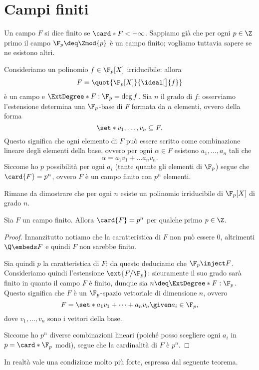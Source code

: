 \section{Campi finiti}

Un campo $F$ si dice finito se $\card*{F} < +\infty$. Sappiamo già che per ogni $p \in \Z$ primo il campo $\F_p \deq \Zmod{p}$ è un campo finito; vogliamo tuttavia sapere se ne esistono altri.

Consideriamo un polinomio $f \in \F_p[X]$ irriducibile: allora \[
    F = \quot{\F_p[X]}{\ideal[\big]{f}}    
\] è un campo e $\ExtDegree*{F : \F_p} = \deg f$. Sia $n$ il grado di $f$: osserviamo l'estensione determina una $\F_p$-base di $F$ formata da $n$ elementi, ovvero della forma \[
    \set*{v_1, \dots, v_n} \subseteq F.    
\] Questo significa che ogni elemento di $F$ può essere scritto come combinazione lineare degli elementi della base, ovvero per ogni $\alpha \in F$ esistono $a_1, \dots, a_n$ tali che \[
    \alpha = a_1v_1 + \dots a_nv_n.    
\] Siccome ho $p$ possibilità per ogni $a_i$ (tante quante gli elementi di $\F_p$) segue che $\card{F} = p^n$, ovvero $F$ è un campo finito con $p^n$ elementi.

Rimane da dimostrare che per ogni $n$ esiste un polinomio irriducibile di $\F_p[X]$ di grado $n$.

\begin{proposition}
    Sia $F$ un campo finito. Allora $\card{F} = p^n$ per qualche primo $p \in \Z$.
\end{proposition}
\begin{proof}
    Innanzitutto notiamo che la caratteristica di $F$ non può essere $0$, altrimenti $\Q \embeds F$ e quindi $F$ non sarebbe finito.

    Sia quindi $p$ la caratteristica di $F$: da questo deduciamo che $\F_p \inject F$. Consideriamo quindi l'estensione $\ext{F / \F_p}$: sicuramente il suo grado sarà finito in quanto il campo $F$ è finito, dunque sia $n \deq \ExtDegree*{F : \F_p}$. Questo significa che $F$ è un $\F_p$-spazio vettoriale di dimensione $n$, ovvero \[
        F = \set*{a_1v_1 + \dots + a_nv_n \given a_i \in \F_p},    
    \] dove $v_1, \dots, v_n$ sono i vettori della base. 

    Siccome ho $p^n$ diverse combinazioni lineari (poiché posso scegliere ogni $a_i$ in $p = \card*{\F_p}$ modi), segue che la cardinalità di $F$ è $p^n$.
\end{proof}

In realtà vale una condizione molto più forte, espressa dal seguente teorema.

